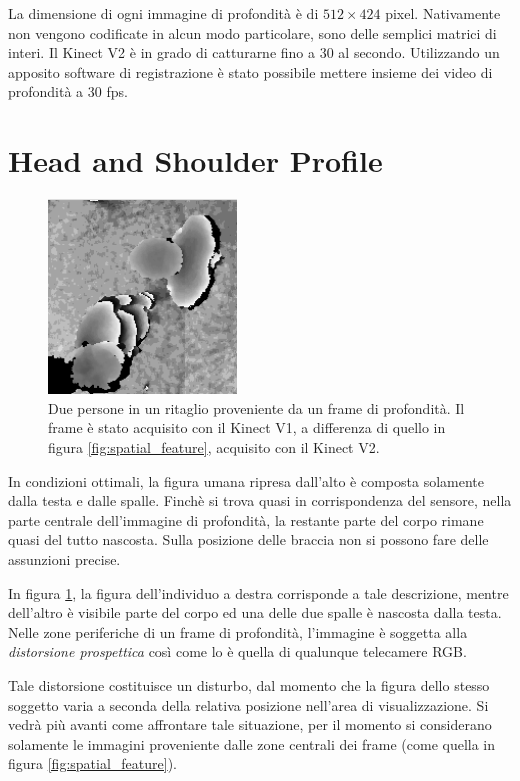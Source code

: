 La dimensione di ogni immagine di profondità è di $512 \times 424$ pixel. Nativamente non vengono codificate in alcun modo particolare, sono delle semplici matrici di interi.
Il Kinect V2 è in grado di catturarne fino a 30 al secondo. Utilizzando un apposito software di registrazione è stato possibile mettere insieme dei video di profondità a 30 fps.


\section{Head and Shoulder Profile}
\label{sec:hasp}

\begin{figure}
    \centering
    \includegraphics[width=5cm]{img/no_occlusion.png}
    \caption{Due persone in un ritaglio proveniente da un frame di profondità. Il frame è stato acquisito con il Kinect V1, a differenza di quello in figura \ref{fig:spatial_feature}, acquisito con il Kinect V2.}
    \label{fig:no_occlusion}
\end{figure}

In condizioni ottimali, la figura umana ripresa dall'alto è composta solamente dalla testa e dalle spalle.
Finchè si trova quasi in corrispondenza del sensore, nella parte centrale dell'immagine di profondità, la restante parte del corpo rimane quasi del tutto nascosta. Sulla posizione delle braccia non si possono fare delle assunzioni precise.

In figura \ref{fig:no_occlusion}, la figura dell'individuo a destra corrisponde a tale descrizione, mentre dell'altro è visibile parte del corpo ed una delle due spalle è nascosta dalla testa.
Nelle zone periferiche di un frame di profondità, l'immagine è soggetta alla \emph{distorsione prospettica} così come lo è quella di qualunque telecamere RGB.

Tale distorsione costituisce un disturbo, dal momento che la figura dello stesso soggetto varia a seconda della relativa posizione nell'area di visualizzazione.
Si vedrà più avanti come affrontare tale situazione, per il momento si considerano solamente le immagini proveniente dalle zone centrali dei frame (come quella in figura \ref{fig:spatial_feature}).

